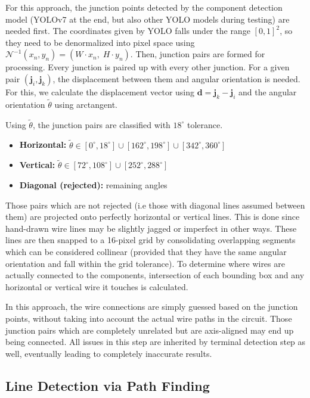 For this approach, the junction points detected by the component detection model (YOLOv7 at the end, but also other YOLO models during testing) are needed first. The coordinates given by YOLO falls under the range $[0,1]^2$, so they need to be denormalized into pixel space using $\mathcal{N}^{-1}(x_n, y_n) = (W \cdot x_n,\; H \cdot y_n)$. Then, junction pairs are formed for processing. Every junction is paired up with every other junction. For a given pair $(\mathbf{j}_i, \mathbf{j}_k)$, the displacement between them and angular orientation is needed. For this, we calculate the displacement vector using $\mathbf{d} = \mathbf{j}_k - \mathbf{j}_i$ and the angular orientation $\tilde{\theta}$ using arctangent.

Using $\tilde{\theta}$, the junction pairs are classified with $18^\circ$ tolerance.
\begin{itemize}
    \item \textbf{Horizontal:} $\tilde{\theta} \in [0^\circ, 18^\circ] \cup [162^\circ, 198^\circ] \cup [342^\circ, 360^\circ]$
    \item \textbf{Vertical:} $\tilde{\theta} \in [72^\circ, 108^\circ] \cup [252^\circ, 288^\circ]$
    \item \textbf{Diagonal (rejected):} remaining angles
\end{itemize}

Those pairs which are not rejected (i.e those with diagonal lines assumed between them) are projected onto perfectly horizontal or vertical lines. This is done since hand-drawn wire lines may be slightly jagged or imperfect in other ways. These lines are then snapped to a 16-pixel grid by consolidating overlapping segments which can be considered collinear (provided that they have the same angular orientation and fall within the grid tolerance). To determine where wires are actually connected to the components, intersection of each bounding box and any horizontal or vertical wire it touches is calculated.

In this approach, the wire connections are simply guessed based on the junction points, without taking into account the actual wire paths in the circuit. Those junction pairs which are completely unrelated but are axis-aligned may end up being connected. All issues in this step are inherited by terminal detection step as well, eventually leading to completely inaccurate results.

\subsection{Line Detection via Path Finding}
\label{sec:line-detection-pathfinding}

